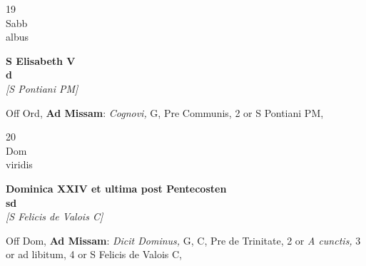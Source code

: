 \documentclass[10pt, openany]{book}
\begin{document}
        \begin{center}
            \begin{minipage}{3.5in}
                \vspace{2em}
                \begin{minipage}{0.5in}
                    {\Huge 19} \\
                    {\normalsize Sabb} \\
                    {\normalsize albus}
                \end{minipage}
                \begin{minipage}{3.0in}
                    \textbf{ \large S Elisabeth V \\
                    \textnormal{\normalsize d}} \\ \textit{[S Pontiani PM]} \\ 
                \end{minipage}
                \begin{justify}Off Ord, \textbf{Ad Missam}: \textit{Cognovi,} G, Pre Communis, 2 or S Pontiani PM,  
                \end{justify}
            \end{minipage}
        \end{center}
    
        \begin{center}
            \begin{minipage}{3.5in}
                \vspace{2em}
                \begin{minipage}{0.5in}
                    {\Huge 20} \\
                    {\normalsize Dom} \\
                    {\normalsize viridis}
                \end{minipage}
                \begin{minipage}{3.0in}
                    \textbf{ \large Dominica XXIV et ultima post Pentecosten \\
                    \textnormal{\normalsize sd}} \\ \textit{[S Felicis de Valois C]} \\ 
                \end{minipage}
                \begin{justify}Off Dom, \textbf{Ad Missam}: \textit{Dicit Dominus,} G, C, Pre de Trinitate, 2 or \textit{A cunctis,} 3 or ad libitum, 4 or S Felicis de Valois C,  
                \end{justify}
            \end{minipage}
        \end{center}
    
\end{document}
